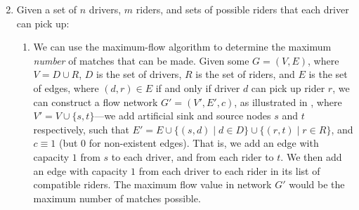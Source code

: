 \documentclass{article}
\begin{document}
\begin{enumerate}[label=(\alph*)]
    \setcounter{enumi}{1}

    \item Given a set of $n$ drivers, $m$ riders, and sets of possible riders that each driver can pick up:
    
    \begin{enumerate}[label=(\roman*)]
        \item We can use the maximum-flow algorithm to determine the maximum \textit{number} of matches that can be made. Given some $G = (V, E)$, where $V = D \cup R$, $D$ is the set of drivers, $R$ is the set of riders, and $E$ is the set of edges, where $(d, r) \in E$ if and only if driver $d$ can pick up rider $r$, we can construct a flow network $G' = (V', E', c)$, as illustrated in , where $V' = V \cup \{s, t\}$---we add artificial sink and source nodes $s$ and $t$ respectively, such that $E' = E \cup \{(s, d) \mid d \in D\} \cup \{(r, t) \mid r \in R\}$, and $c \equiv 1$ (but 0 for non-existent edges). That is, we add an edge with capacity $1$ from $s$ to each driver, and from each rider to $t$. We then add an edge with capacity $1$ from each driver to each rider in its list of compatible riders. The maximum flow value in network $G'$ would be the maximum number of matches possible.
        
        \begin{figure*}[h]
            \centering
\end{figure*}
\end{enumerate}
\end{enumerate}
\end{document}

